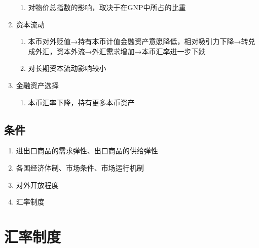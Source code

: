 \documentclass[12pt]{book}
\begin{document}
\begin{enumerate}[1.]
\begin{enumerate}[(1)]
              \item 对物价总指数的影响，取决于在GNP中所占的比重
          \end{enumerate}
    \item 资本流动
          \begin{enumerate}[(1)]
              \item 本币对外贬值→持有本币计值金融资产意愿降低，相对吸引力下降→转兑成外汇，资本外流→外汇需求增加→本币汇率进一步下跌
              \item 对长期资本流动影响较小
          \end{enumerate}
    \item 金融资产选择
          \begin{enumerate}[(1)]
              \item 本币汇率下降，持有更多本币资产
          \end{enumerate}
\end{enumerate}



















\subsection{条件}

\begin{enumerate}[1.]
    \item 进出口商品的需求弹性、出口商品的供给弹性  
    \item 各国经济体制、市场条件、市场运行机制  
    \item 对外开放程度   
    \item 汇率制度
\end{enumerate}










\section{汇率制度}



\end{document}
